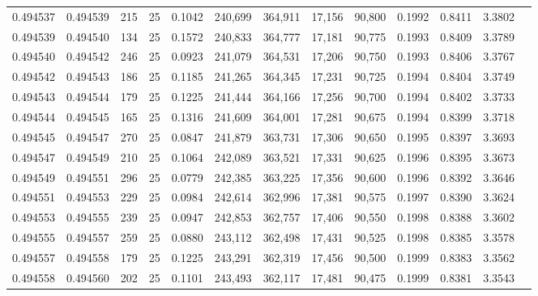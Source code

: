 \begin{tabular}{rrrrrrrrrrrrr}
0.494537 & 0.494539 &   215 &  25 &                                     0.1042 & 240,699 & 364,911 &  17,156 &  90,800 & 0.1992 & 0.8411 & 3.3802 \\
0.494539 & 0.494540 &   134 &  25 &                                     0.1572 & 240,833 & 364,777 &  17,181 &  90,775 & 0.1993 & 0.8409 & 3.3789 \\
0.494540 & 0.494542 &   246 &  25 &                                     0.0923 & 241,079 & 364,531 &  17,206 &  90,750 & 0.1993 & 0.8406 & 3.3767 \\
0.494542 & 0.494543 &   186 &  25 &                                     0.1185 & 241,265 & 364,345 &  17,231 &  90,725 & 0.1994 & 0.8404 & 3.3749 \\
0.494543 & 0.494544 &   179 &  25 &                                     0.1225 & 241,444 & 364,166 &  17,256 &  90,700 & 0.1994 & 0.8402 & 3.3733 \\
0.494544 & 0.494545 &   165 &  25 &                                     0.1316 & 241,609 & 364,001 &  17,281 &  90,675 & 0.1994 & 0.8399 & 3.3718 \\
0.494545 & 0.494547 &   270 &  25 &                                     0.0847 & 241,879 & 363,731 &  17,306 &  90,650 & 0.1995 & 0.8397 & 3.3693 \\
0.494547 & 0.494549 &   210 &  25 &                                     0.1064 & 242,089 & 363,521 &  17,331 &  90,625 & 0.1996 & 0.8395 & 3.3673 \\
0.494549 & 0.494551 &   296 &  25 &                                     0.0779 & 242,385 & 363,225 &  17,356 &  90,600 & 0.1996 & 0.8392 & 3.3646 \\
0.494551 & 0.494553 &   229 &  25 &                                     0.0984 & 242,614 & 362,996 &  17,381 &  90,575 & 0.1997 & 0.8390 & 3.3624 \\
0.494553 & 0.494555 &   239 &  25 &                                     0.0947 & 242,853 & 362,757 &  17,406 &  90,550 & 0.1998 & 0.8388 & 3.3602 \\
0.494555 & 0.494557 &   259 &  25 &                                     0.0880 & 243,112 & 362,498 &  17,431 &  90,525 & 0.1998 & 0.8385 & 3.3578 \\
0.494557 & 0.494558 &   179 &  25 &                                     0.1225 & 243,291 & 362,319 &  17,456 &  90,500 & 0.1999 & 0.8383 & 3.3562 \\
0.494558 & 0.494560 &   202 &  25 &                                     0.1101 & 243,493 & 362,117 &  17,481 &  90,475 & 0.1999 & 0.8381 & 3.3543 \\

\end{tabular}
